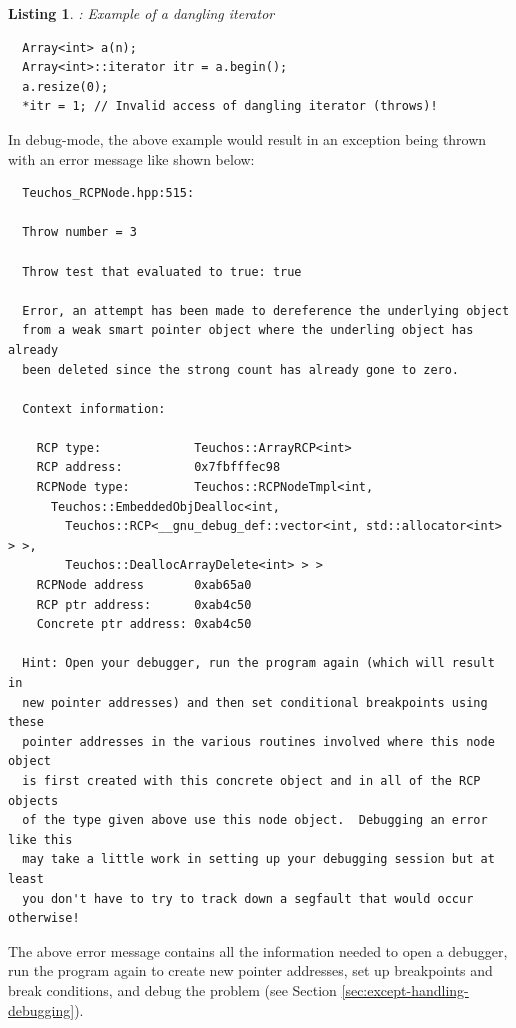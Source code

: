 \documentclass[pdf,ps2pdf,11pt]{SANDreport}
\newtheorem{listing}{Listing}
\begin{document}
\begin{listing}: Example of a dangling iterator \\
\label{listing:Array-dangling-iterator}
{\small\begin{verbatim}
  Array<int> a(n);
  Array<int>::iterator itr = a.begin();
  a.resize(0);
  *itr = 1; // Invalid access of dangling iterator (throws)!
\end{verbatim}}
\end{listing}

In debug-mode, the above example would result in an exception being
thrown with an error message like shown below:

{\small\begin{verbatim}
  Teuchos_RCPNode.hpp:515:
  
  Throw number = 3
  
  Throw test that evaluated to true: true
  
  Error, an attempt has been made to dereference the underlying object
  from a weak smart pointer object where the underling object has already
  been deleted since the strong count has already gone to zero.
  
  Context information:
  
    RCP type:             Teuchos::ArrayRCP<int>
    RCP address:          0x7fbfffec98
    RCPNode type:         Teuchos::RCPNodeTmpl<int,
      Teuchos::EmbeddedObjDealloc<int,
        Teuchos::RCP<__gnu_debug_def::vector<int, std::allocator<int> > >,
        Teuchos::DeallocArrayDelete<int> > >
    RCPNode address       0xab65a0
    RCP ptr address:      0xab4c50
    Concrete ptr address: 0xab4c50
  
  Hint: Open your debugger, run the program again (which will result in
  new pointer addresses) and then set conditional breakpoints using these
  pointer addresses in the various routines involved where this node object
  is first created with this concrete object and in all of the RCP objects
  of the type given above use this node object.  Debugging an error like this
  may take a little work in setting up your debugging session but at least
  you don't have to try to track down a segfault that would occur otherwise!
\end{verbatim}}

The above error message contains all the information needed to open a
debugger, run the program again to create new pointer addresses, set
up breakpoints and break conditions, and debug the problem (see
Section {}\ref{sec:except-handling-debugging}).
\end{document}
